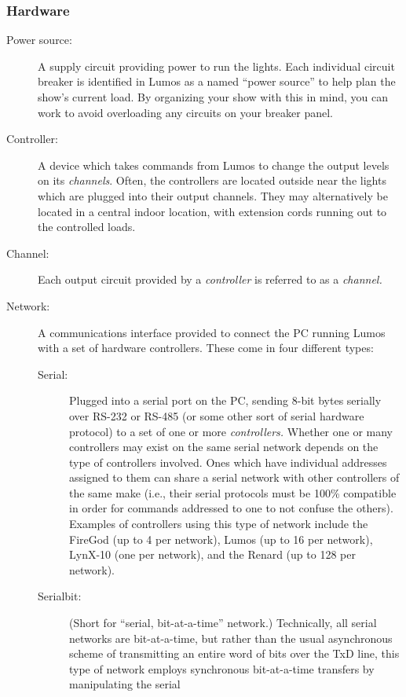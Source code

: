 \documentclass{article}
\begin{document}
\subsubsection{Hardware}
\begin{description}
	\item[Power source:]
 		A supply circuit providing power to run the lights.  Each individual
		circuit breaker is identified in Lumos as a named ``power source''
		to help plan the show's current load.  By organizing your show with
		this in mind, you can work to avoid overloading any circuits on
		your breaker panel.
	\item[Controller:]
		A device which takes commands from Lumos to change the output levels
		on its {\em channels\/}.  Often, the controllers are located outside
		near the lights which are plugged into their output channels.  They
		may alternatively be located in a central indoor location, with
		extension cords running out to the controlled loads.
	\item[Channel:]
		Each output circuit provided by a {\em controller\/} is referred to
		as a {\em channel.\/}
	\item[Network:]
		A communications interface provided to connect the PC running Lumos
		with a set of hardware controllers.  These come in four different
		types:
		\begin{description}
			\item[Serial:]
				Plugged into a serial port on the PC, sending 8-bit bytes
				serially over RS-232 or RS-485 (or some other sort of serial
				hardware protocol) to a set of one or more {\em
				controllers.\/}  Whether one or many controllers may exist
				on the same serial network depends on the type of controllers
				involved.  Ones which have individual addresses assigned to
				them can share a serial network with other controllers of the
				same make (i.e., their serial protocols must be 100\%
				compatible in order for commands addressed to one to not
				confuse the others).  
				Examples of controllers using this type of network include the
				FireGod (up to 4 per network), 
				Lumos (up to 16 per network), 
				LynX-10 (one per network),
				and the 
				Renard (up to 128 per network).
			\item[Serialbit:]
				(Short for ``serial, bit-at-a-time'' network.)  Technically, 
				all serial networks are bit-at-a-time, but rather than the
				usual asynchronous scheme of transmitting an entire word of
				bits over the TxD line, this type of network employs
				synchronous bit-at-a-time transfers by manipulating the serial

\end{description}
\end{description}
\end{document}
